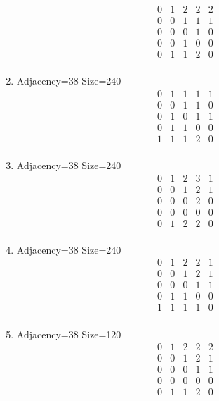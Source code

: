 \documentclass[12pt]{article}
\begin{document}
\begin{multicols}{3}
\begin{enumerate}
\begin{equation*}
\begin{array}{ccccc}
0&1&2&2&2\\
0&0&1&1&1\\
0&0&0&1&0\\
0&0&1&0&0\\
0&1&1&2&0\\
\end{array}
\end{equation*}
\item Adjacency=38 Size=240
\begin{equation*}
\begin{array}{ccccc}
0&1&1&1&1\\
0&0&1&1&0\\
0&1&0&1&1\\
0&1&1&0&0\\
1&1&1&2&0\\
\end{array}
\end{equation*}
\item Adjacency=38 Size=240
\begin{equation*}
\begin{array}{ccccc}
0&1&2&3&1\\
0&0&1&2&1\\
0&0&0&2&0\\
0&0&0&0&0\\
0&1&2&2&0\\
\end{array}
\end{equation*}
\item Adjacency=38 Size=240
\begin{equation*}
\begin{array}{ccccc}
0&1&2&2&1\\
0&0&1&2&1\\
0&0&0&1&1\\
0&1&1&0&0\\
1&1&1&1&0\\
\end{array}
\end{equation*}
\item Adjacency=38 Size=120
\begin{equation*}
\begin{array}{ccccc}
0&1&2&2&2\\
0&0&1&2&1\\
0&0&0&1&1\\
0&0&0&0&0\\
0&1&1&2&0\\
\end{array}

\end{equation*}
\end{enumerate}
\end{multicols}
\end{document}
